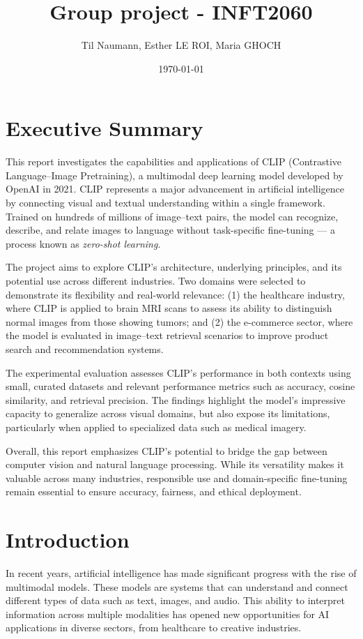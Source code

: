 \documentclass[12pt]{article}
\title{Group project - INFT2060}
\author{Til Naumann, Esther LE ROI, Maria GHOCH}
\date{\today}
\begin{document}
\maketitle
\newpage

\tableofcontents
\newpage

\section*{Executive Summary}

This report investigates the capabilities and applications of {CLIP (Contrastive Language–Image Pretraining)}, 
a multimodal deep learning model developed by OpenAI in 2021. CLIP represents a major advancement in artificial intelligence by connecting visual and textual understanding within a single framework. 
Trained on hundreds of millions of image–text pairs, the model can recognize, describe, and relate images to language without task-specific fine-tuning — a process known as \textit{zero-shot learning}.

The project aims to explore CLIP’s architecture, underlying principles, and its potential use across different industries. 
Two domains were selected to demonstrate its flexibility and real-world relevance: 
(1) the {healthcare industry}, where CLIP is applied to brain MRI scans to assess its ability to distinguish normal images from those showing tumors; and 
(2) the {e-commerce sector}, where the model is evaluated in image–text retrieval scenarios to improve product search and recommendation systems. 

The experimental evaluation assesses CLIP’s performance in both contexts using small, curated datasets and relevant performance metrics such as accuracy, cosine similarity, and retrieval precision. 
The findings highlight the model’s impressive capacity to generalize across visual domains, but also expose its limitations, particularly when applied to specialized data such as medical imagery.

Overall, this report emphasizes CLIP’s potential to bridge the gap between computer vision and natural language processing. 
While its versatility makes it valuable across many industries, responsible use and domain-specific fine-tuning remain essential to ensure accuracy, fairness, and ethical deployment.
\newpage

\section{Introduction}
In recent years, artificial intelligence has made significant progress with the rise of multimodal models. These models are systems that can understand and connect different types of data such as text, images, and audio. This ability to interpret information across multiple modalities has opened new opportunities for AI applications in diverse sectors, from healthcare to creative industries.
\end{document}
